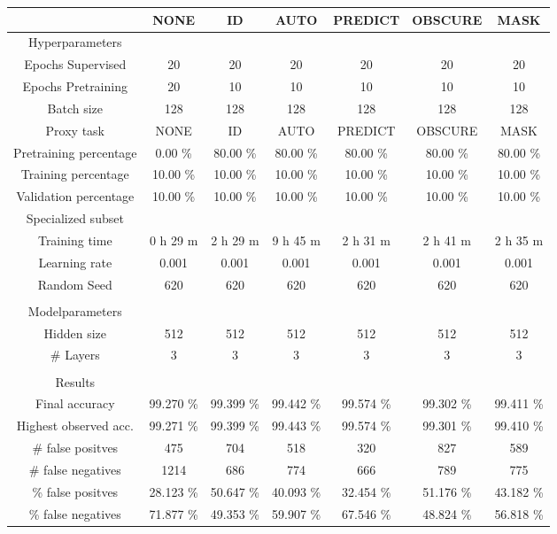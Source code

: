 \begin{table}[htb]
    \centering
    \begin{tabular}{@{}ccccccc@{}}
        \toprule
         &  NONE &  ID &  AUTO &  PREDICT &  OBSCURE &  MASK \\
        \midrule
        Hyperparameters &  &  &  &  &  &  \\
        Epochs Supervised &  20 &  20 &  20 &  20 &  20 &  20 \\
        Epochs Pretraining &  20 &  10 &  10 &  10 &  10 &  10 \\
        Batch size &  128 &  128 &  128 &  128 &  128 &  128 \\
        Proxy task &  NONE &  ID &  AUTO &  PREDICT &  OBSCURE &  MASK \\
        Pretraining percentage &  0.00 \% &  80.00 \% &  80.00 \% &  80.00 \% &  80.00 \% &  80.00 \% \\
        Training percentage &  10.00 \% &  10.00 \% &  10.00 \% &  10.00 \% &  10.00 \% &  10.00 \% \\
        Validation percentage &  10.00 \% &  10.00 \% &  10.00 \% &  10.00 \% &  10.00 \% &  10.00 \% \\
        Specialized subset &   &   &   &   &   &   \\
        Training time &  0 h 29 m &  2 h 29 m &  9 h 45 m &  2 h 31 m &  2 h 41 m &  2 h 35 m \\
        Learning rate &  0.001 &  0.001 &  0.001 &  0.001 &  0.001 &  0.001 \\
        Random Seed &  620 &  620 &  620 &  620 &  620 &  620 \\
         \\
        Modelparameters &  &  &  &  &  &  \\
        Hidden size &  512 &  512 &  512 &  512 &  512 &  512 \\
        \# Layers &  3 &  3 &  3 &  3 &  3 &  3 \\
         \\
        Results &  &  &  &  &  &  \\
        Final accuracy &  99.270 \% &  99.399 \% &  99.442 \% &  99.574 \% &  99.302 \% &  99.411 \% \\
        Highest observed acc. &  99.271 \% &  99.399 \% &  99.443 \% &  99.574 \% &  99.301 \% &  99.410 \% \\
        \# false positves &  475 &  704 &  518 &  320 &  827 &  589 \\
        \# false negatives &  1214 &  686 &  774 &  666 &  789 &  775 \\
        \% false positves &  28.123 \% &  50.647 \% &  40.093 \% &  32.454 \% &  51.176 \% &  43.182 \% \\
        \% false negatives &  71.877 \% &  49.353 \% &  59.907 \% &  67.546 \% &  48.824 \% &  56.818 \% \\
        \bottomrule
    \end{tabular}
\end{table}
